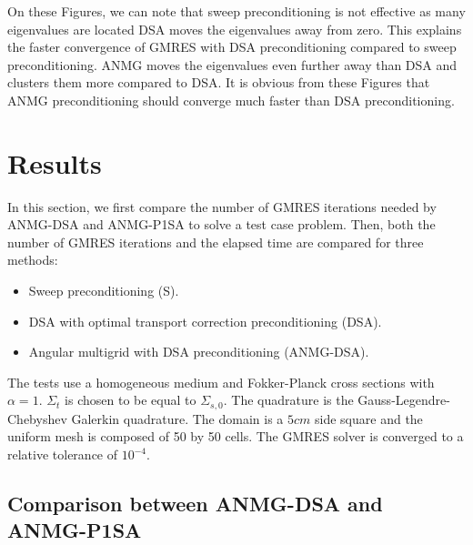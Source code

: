 \documentclass[preprint,10pt]{elsarticle}
\renewcommand{\(}{\left(}
\renewcommand{\)}{\right)}
\renewcommand{\[}{\left[}
\renewcommand{\]}{\right]}
\begin{document}
On these Figures, we can note that sweep preconditioning is not effective as many eigenvalues
are located DSA moves the eigenvalues away from
zero. This explains the faster convergence of GMRES with DSA preconditioning
compared to sweep preconditioning. ANMG moves the
eigenvalues even further away than DSA and clusters them more compared to DSA.
It is obvious from these Figures that ANMG preconditioning should converge much faster than
DSA preconditioning. %

\section{Results} \label{sec:results}

In this section, we first compare the number of GMRES iterations needed by 
ANMG-DSA and ANMG-P1SA to solve a test case problem. Then, both the number of GMRES 
iterations and the elapsed time are compared for three methods:
\begin{itemize}
\item Sweep preconditioning (S).
\item DSA with optimal transport correction preconditioning (DSA).
\item Angular multigrid with DSA preconditioning (ANMG-DSA).
\end{itemize}
The tests use a homogeneous medium and Fokker-Planck cross
sections with $\alpha=1$. $\Sigma_{t}$ is chosen to be equal to
$\Sigma_{s,0}$. The quadrature is the Gauss-Legendre-Chebyshev Galerkin
quadrature. The domain is a $5cm$ side square and the uniform mesh is composed
of 50 by 50 
cells. The GMRES solver is converged to a relative tolerance of $10^{-4}$.

\subsection{Comparison between ANMG-DSA and ANMG-P1SA}
\end{document}
